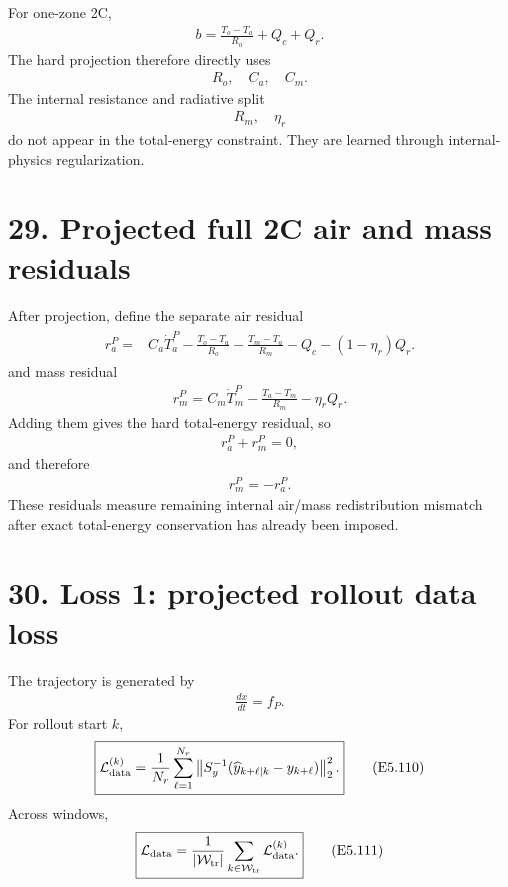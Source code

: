 \documentclass[11pt]{article}
\begin{document}
For one-zone 2C,
\begin{align}
b=\frac{T_o-T_a}{R_o}+Q_c+Q_r.
\end{align}
The hard projection therefore directly uses
\begin{align}
\boxed{R_o,\quad C_a,\quad C_m.}
\tag{E5.103}
\end{align}
The internal resistance and radiative split
\begin{align}
\boxed{R_m,\quad\eta_r}
\tag{E5.104}
\end{align}
do not appear in the total-energy constraint. They are learned through internal-physics regularization.

\section*{29. Projected full 2C air and mass residuals}

After projection, define the separate air residual
\begin{align}
\boxed{\begin{aligned}r_a^P={}&C_a\dot T_a^P-\frac{T_o-T_a}{R_o}-\frac{T_m-T_a}{R_m}-Q_c-(1-\eta_r)Q_r.\end{aligned}}
\tag{E5.105}
\end{align}
and mass residual
\begin{align}
\boxed{r_m^P=C_m\dot T_m^P-\frac{T_a-T_m}{R_m}-\eta_rQ_r.}
\tag{E5.106}
\end{align}
Adding them gives the hard total-energy residual, so
\begin{align}
\boxed{r_a^P+r_m^P=0,}
\tag{E5.107}
\end{align}
and therefore
\begin{align}
\boxed{r_m^P=-r_a^P.}
\tag{E5.108}
\end{align}
These residuals measure remaining internal air/mass redistribution mismatch after exact total-energy conservation has already been imposed.

\section*{30. Loss 1: projected rollout data loss}

The trajectory is generated by
\begin{align}
\boxed{\frac{dx}{dt}=f_P.}
\tag{E5.109}
\end{align}
For rollout start \(k\),
\begin{align}
\boxed{\mathcal L_{\rm data}^{(k)}=\frac{1}{N_r}\sum_{\ell=1}^{N_r}\left\|S_y^{-1}(\widehat y_{k+\ell|k}-y_{k+\ell})\right\|_2^2.}
\tag{E5.110}
\end{align}
Across windows,
\begin{align}
\boxed{\mathcal L_{\rm data}=\frac{1}{|\mathcal W_{\rm tr}|}\sum_{k\in\mathcal W_{\rm tr}}\mathcal L_{\rm data}^{(k)}.}
\tag{E5.111}
\end{align}
\end{document}
